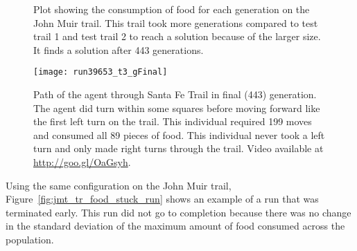 \begin{figure}[ht]
\centering
{}
\caption[Food Consumed in John Muir Trail]{Plot showing the consumption of food for each generation on the John Muir trail. This trail took more generations compared to test trail 1 and test trail 2 to reach a solution because of the larger size. It finds a solution after 443 generations.}
\label{fig:jmt_tr_food_consumed}
\end{figure}

\begin{figure}[ht]
\centering
\texttt{[image: run39653\_t3\_gFinal]}
\caption[Individual Path in John Muir Trail]{Path of the agent through Santa Fe Trail in final (443) generation. The agent did turn within some squares before moving forward like the first left turn on the trail. This individual required 199 moves and consumed all 89 pieces of food. This individual never took a left turn and only made right turns through the trail. Video available at \url{http://goo.gl/OaGsyh}.}
\label{fig:jmt_tr_final_gen}
\end{figure}

\clearpage
Using the same configuration on the John Muir trail, Figure~\ref{fig:jmt_tr_food_stuck_run} shows an example of a run that was terminated early. This run did not go to completion because there was no change in the standard deviation of the maximum amount of food consumed across the population.

